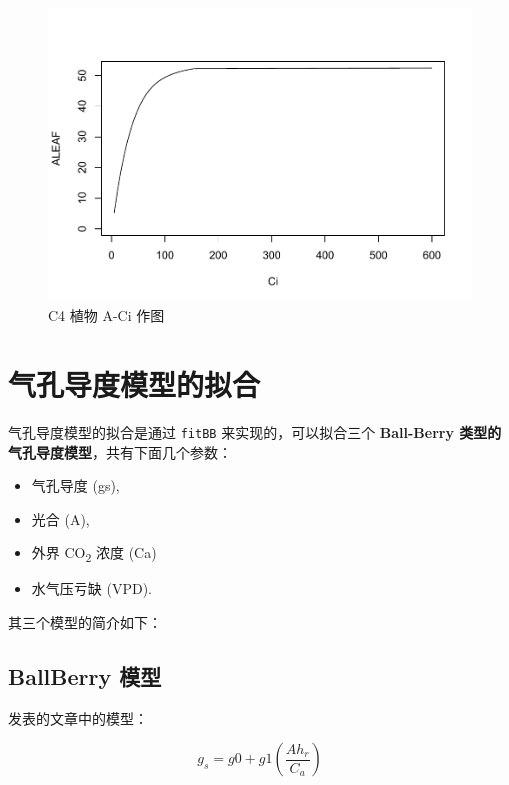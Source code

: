 \documentclass[
]{krantz}
\providecommand{\tightlist}{%
  \setlength{\itemsep}{0pt}\setlength{\parskip}{0pt}}
\begin{document}
\begin{figure}
\centering
\includegraphics{bookdown_files/figure-latex/unnamed-chunk-19-1.pdf}
\caption{\label{fig:unnamed-chunk-19}C4 植物 A-Ci 作图}
\end{figure}

\cleardoublepage

\hypertarget{stomotal_sim}{%
\chapter{气孔导度模型的拟合}\label{stomotal_sim}}

气孔导度模型的拟合是通过 \texttt{fitBB} 来实现的，可以拟合三个 \textbf{Ball-Berry 类型的气孔导度模型}，共有下面几个参数：

\begin{itemize}
\tightlist
\item
  气孔导度 (gs),
\item
  光合 (A),
\item
  外界 CO\textsubscript{2} 浓度 (Ca)
\item
  水气压亏缺 (VPD).
\end{itemize}

其三个模型的简介如下：

\hypertarget{ballberry}{%
\section{BallBerry 模型}\label{ballberry}}

\citet{Ball1987A} 发表的文章中的模型：

\begin{equation}
g_s = g0 + g1(\frac{A h_r}{C_a})
\label{eq:ballberry}
\end{equation}
\end{document}
